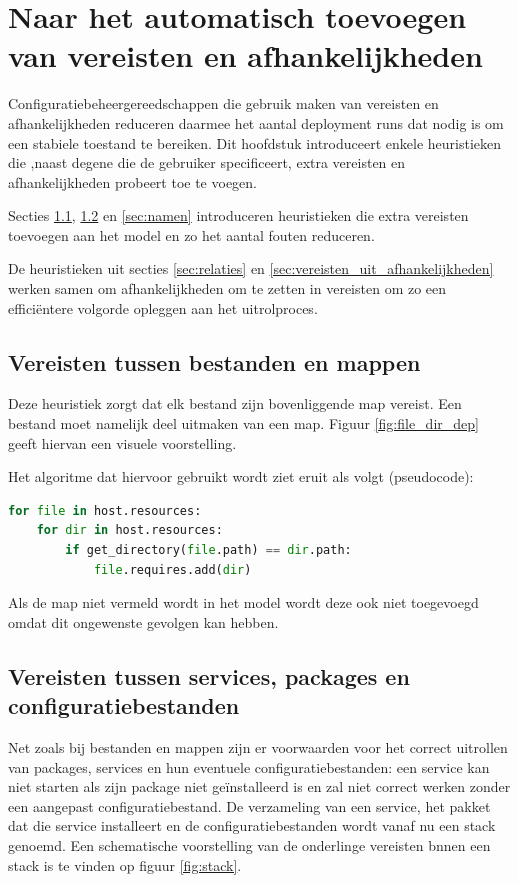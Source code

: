 
\chapter{Naar het automatisch toevoegen van vereisten en afhankelijkheden}
\label{sec:afhankelijkheden}
Configuratiebeheergereedschappen die gebruik maken van vereisten en afhankelijkheden reduceren daarmee het aantal deployment runs dat nodig is om een stabiele toestand te bereiken.
Dit hoofdstuk introduceert enkele heuristieken die ,naast degene die de gebruiker specificeert, extra vereisten en afhankelijkheden probeert toe te voegen.

Secties \ref{sec:bestanden_en_mappen}, \ref{sec:stacks} en \ref{sec:namen} introduceren heuristieken die extra vereisten toevoegen aan het model en zo het aantal fouten reduceren.

De heuristieken uit secties \ref{sec:relaties} en \ref{sec:vereisten_uit_afhankelijkheden} werken samen om afhankelijkheden om te zetten in vereisten om zo een effici\"entere volgorde opleggen aan het uitrolproces.  

\section{Vereisten tussen bestanden en mappen}
\label{sec:bestanden_en_mappen}
Deze heuristiek zorgt dat elk bestand zijn bovenliggende map vereist.
Een bestand moet namelijk deel uitmaken van een map.
Figuur \ref{fig:file_dir_dep} geeft hiervan een visuele voorstelling.

Het algoritme dat hiervoor gebruikt wordt ziet eruit als volgt (pseudocode):
\begin{minipage}{\textwidth}
\begin{lstlisting}[language=Python]
for file in host.resources:
    for dir in host.resources:
        if get_directory(file.path) == dir.path:
            file.requires.add(dir)
\end{lstlisting}
\end{minipage}

Als de map niet vermeld wordt in het model wordt deze ook niet toegevoegd omdat dit ongewenste gevolgen kan hebben. 

\section{Vereisten tussen services, packages en configuratiebestanden}
\label{sec:stacks}
Net zoals bij bestanden en mappen zijn er voorwaarden voor het correct uitrollen van packages, services en hun eventuele configuratiebestanden:
een service kan niet starten als zijn package niet ge\"installeerd is en zal niet correct werken zonder een aangepast configuratiebestand.
De verzameling van een service, het pakket dat die service installeert en de configuratiebestanden wordt vanaf nu een stack genoemd.
Een schematische voorstelling van de onderlinge vereisten bnnen een stack is te vinden op figuur \ref{fig:stack}.

